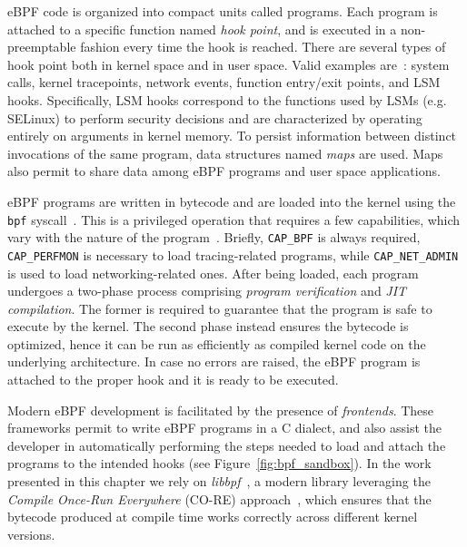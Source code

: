 eBPF code is organized into compact units called
programs. Each program is attached to a specific function named {\em
  hook point}, and is executed in a non-preemptable fashion every time
the hook is reached. There are several types of hook point both in
kernel space and in user space. Valid examples
are~\cite{bpf-lsm-hooks}: system calls, kernel tracepoints, network
events, function entry/exit points, and LSM
hooks. Specifically, LSM hooks correspond to the functions
  used by LSMs (e.g. SELinux) to perform security decisions and are
  characterized by operating entirely on arguments in kernel memory.
To persist information between distinct invocations of the same
program, data structures named {\em maps} are used. Maps also permit
to share data among eBPF programs and user space
applications.

eBPF programs are written in bytecode and are loaded into the kernel
using the {\tt bpf} syscall~\cite{linux-bpf}. This is a privileged
operation that requires a few capabilities, which vary with the nature
of the program~\cite{starovoitov2020capbpf}. Briefly, {\tt CAP\_BPF}
is always required, {\tt CAP\_PERFMON} is necessary to load
tracing-related programs, while {\tt CAP\_NET\_ADMIN} is used to load
networking-related ones. After being loaded, each program undergoes a
two-phase process comprising {\em program verification} and {\em JIT
  compilation}. The former is required to guarantee that the program
is safe to execute by the kernel. The second phase instead ensures the
bytecode is optimized, hence it can be run as efficiently as compiled
kernel code on the underlying architecture. In case no errors are
raised, the eBPF program is attached to the proper hook and it is ready
to be executed.

Modern eBPF development is facilitated by the presence of {\em
  frontends}. These frameworks permit to write eBPF programs in a C
dialect, and also assist the developer in automatically performing the
steps needed to load and attach the programs to the intended hooks
(see Figure~\ref{fig:bpf_sandbox}). In the work presented in this
chapter we rely on {\em libbpf}~\cite{libbpf-doc}, a modern library
leveraging the {\em Compile Once-Run Everywhere} (CO-RE)
approach~\cite{andrii2020bpfCORE}, which ensures that the bytecode
produced at compile time works correctly across different kernel
versions.

